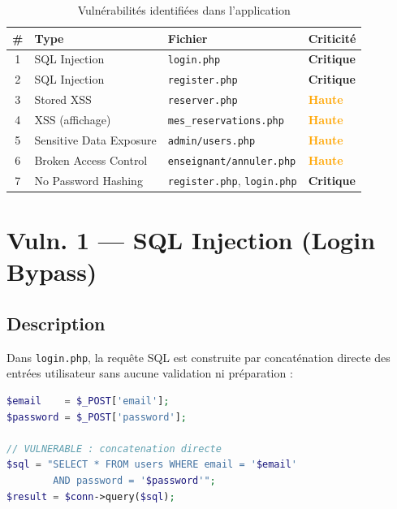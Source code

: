 ﻿\documentclass[12pt,a4paper]{report}
\begin{document}
\begin{table}[H]
  \centering
  \small
  \begin{tabular}{clll}
    \toprule
    \textbf{\#} & \textbf{Type} & \textbf{Fichier} & \textbf{Criticité} \\
    \midrule
    1 & SQL Injection & \texttt{login.php} & \textcolor{secred}{\textbf{Critique}} \\
    2 & SQL Injection & \texttt{register.php} & \textcolor{secred}{\textbf{Critique}} \\
    3 & Stored XSS & \texttt{reserver.php} & \textcolor{orange}{\textbf{Haute}} \\
    4 & XSS (affichage) & \texttt{mes\_reservations.php} & \textcolor{orange}{\textbf{Haute}} \\
    5 & Sensitive Data Exposure & \texttt{admin/users.php} & \textcolor{orange}{\textbf{Haute}} \\
    6 & Broken Access Control & \texttt{enseignant/annuler.php} & \textcolor{orange}{\textbf{Haute}} \\
    7 & No Password Hashing & \texttt{register.php}, \texttt{login.php} & \textcolor{secred}{\textbf{Critique}} \\
    \bottomrule
  \end{tabular}
  \caption{Vulnérabilités identifiées dans l'application}
\end{table}

\section{Vuln. 1 --- SQL Injection (Login Bypass)}

\subsection{Description}

Dans \texttt{login.php}, la requête SQL est construite par concaténation directe des entrées
utilisateur sans aucune validation ni préparation :

\begin{lstlisting}[language=PHP, caption={Code vulnérable --- login.php}]
$email    = $_POST['email'];
$password = $_POST['password'];

// VULNERABLE : concatenation directe
$sql = "SELECT * FROM users WHERE email = '$email'
        AND password = '$password'";
$result = $conn->query($sql);
\end{lstlisting}
\end{document}
